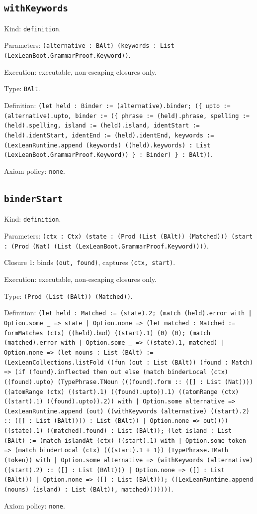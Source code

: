 \documentclass[11pt]{article}
\begin{document}
\subsection*{\texttt{withKeywords}}
\noindent Kind: \texttt{definition}.\par
\noindent Parameters: \texttt{(alternative : BAlt) (keywords : List (LexLeanBoot.GrammarProof.Keyword))}.\par
\noindent Execution: executable, non-escaping closures only.\par
\noindent Type: \texttt{BAlt}.\par
\noindent Definition: \texttt{(let held : Binder := (alternative).binder; (\{ upto := (alternative).upto, binder := (\{ phrase := (held).phrase, spelling := (held).spelling, island := (held).island, identStart := (held).identStart, identEnd := (held).identEnd, keywords := (LexLeanRuntime.append (keywords) ((held).keywords) : List (LexLeanBoot.GrammarProof.Keyword)) \} : Binder) \} : BAlt))}.\par
\noindent Axiom policy: \texttt{none}.\par
\subsection*{\texttt{binderStart}}
\noindent Kind: \texttt{definition}.\par
\noindent Parameters: \texttt{(ctx : Ctx) (state : (Prod (List (BAlt)) (Matched))) (start : (Prod (Nat) (List (LexLeanBoot.GrammarProof.Keyword))))}.\par
\noindent Closure 1: binds \texttt{(out, found)}, captures \texttt{(ctx, start)}.\par
\noindent Execution: executable, non-escaping closures only.\par
\noindent Type: \texttt{(Prod (List (BAlt)) (Matched))}.\par
\noindent Definition: \texttt{(let held : Matched := (state).2; (match (held).error with | Option.some \_ => state | Option.none => (let matched : Matched := formMatches (ctx) ((held).bud) ((start).1) (0) (0); (match (matched).error with | Option.some \_ => ((state).1, matched) | Option.none => (let nouns : List (BAlt) := (LexLeanCollections.listFold ((fun (out : List (BAlt)) (found : Match) => (if (found).inflected then out else (match binderLocal (ctx) ((found).upto) (TypePhrase.TNoun (((found).form :: ([] : List (Nat)))) ((atomRange (ctx) ((start).1) ((found).upto)).1) ((atomRange (ctx) ((start).1) ((found).upto)).2)) with | Option.some alternative => (LexLeanRuntime.append (out) ((withKeywords (alternative) ((start).2) :: ([] : List (BAlt)))) : List (BAlt)) | Option.none => out)))) ((state).1) ((matched).found) : List (BAlt)); (let island : List (BAlt) := (match islandAt (ctx) ((start).1) with | Option.some token => (match binderLocal (ctx) (((start).1 + 1)) (TypePhrase.TMath (token)) with | Option.some alternative => (withKeywords (alternative) ((start).2) :: ([] : List (BAlt))) | Option.none => ([] : List (BAlt))) | Option.none => ([] : List (BAlt))); ((LexLeanRuntime.append (nouns) (island) : List (BAlt)), matched)))))))}.\par
\noindent Axiom policy: \texttt{none}.\par
\end{document}
